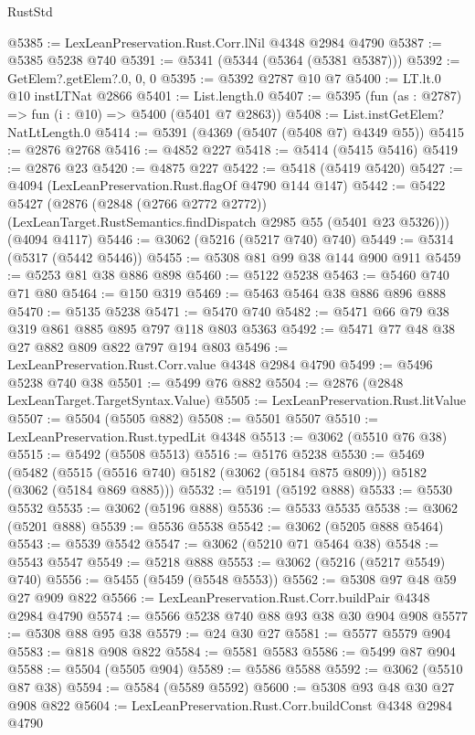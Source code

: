 \begin{lexlean}{RustStd}
\begin{coremodule}
@5385 := LexLeanPreservation.Rust.Corr.lNil @4348 @2984 @4790
@5387 := @5385 @5238 @740
@5391 := @5341 (@5344 (@5364 (@5381 @5387)))
@5392 := GetElem?.getElem?.{0, 0, 0}
@5395 := @5392 @2787 @10 @7
@5400 := LT.lt.{0} @10 instLTNat @2866
@5401 := List.length.{0}
@5407 := @5395 (fun (as : @2787) => fun (i : @10) => @5400 (@5401 @7 @2863))
@5408 := List.instGetElem?NatLtLength.{0}
@5414 := @5391 (@4369 (@5407 (@5408 @7) @4349 @55))
@5415 := @2876 @2768
@5416 := @4852 @227
@5418 := @5414 (@5415 @5416)
@5419 := @2876 @23
@5420 := @4875 @227
@5422 := @5418 (@5419 @5420)
@5427 := @4094 (LexLeanPreservation.Rust.flagOf @4790 @144 @147)
@5442 := @5422
    @5427
    (@2876
      (@2848 (@2766 @2772 @2772))
      (LexLeanTarget.RustSemantics.findDispatch @2985 @55 (@5401 @23 @5326)))
    (@4094 @4117)
@5446 := @3062 (@5216 (@5217 @740) @740)
@5449 := @5314 (@5317 (@5442 @5446))
@5455 := @5308 @81 @99 @38 @144 @900 @911
@5459 := @5253 @81 @38 @886 @898
@5460 := @5122 @5238
@5463 := @5460 @740 @71 @80
@5464 := @150 @319
@5469 := @5463 @5464 @38 @886 @896 @888
@5470 := @5135 @5238
@5471 := @5470 @740
@5482 := @5471 @66 @79 @38 @319 @861 @885 @895 @797 @118 @803 @5363
@5492 := @5471 @77 @48 @38 @27 @882 @809 @822 @797 @194 @803
@5496 := LexLeanPreservation.Rust.Corr.value @4348 @2984 @4790
@5499 := @5496 @5238 @740 @38
@5501 := @5499 @76 @882
@5504 := @2876 (@2848 LexLeanTarget.TargetSyntax.Value)
@5505 := LexLeanPreservation.Rust.litValue
@5507 := @5504 (@5505 @882)
@5508 := @5501 @5507
@5510 := LexLeanPreservation.Rust.typedLit @4348
@5513 := @3062 (@5510 @76 @38)
@5515 := @5492 (@5508 @5513)
@5516 := @5176 @5238
@5530 := @5469
    (@5482 (@5515 (@5516 @740) @5182 (@3062 (@5184 @875 @809))) @5182 (@3062 (@5184 @869 @885)))
@5532 := @5191 (@5192 @888)
@5533 := @5530 @5532
@5535 := @3062 (@5196 @888)
@5536 := @5533 @5535
@5538 := @3062 (@5201 @888)
@5539 := @5536 @5538
@5542 := @3062 (@5205 @888 @5464)
@5543 := @5539 @5542
@5547 := @3062 (@5210 @71 @5464 @38)
@5548 := @5543 @5547
@5549 := @5218 @888
@5553 := @3062 (@5216 (@5217 @5549) @740)
@5556 := @5455 (@5459 (@5548 @5553))
@5562 := @5308 @97 @48 @59 @27 @909 @822
@5566 := LexLeanPreservation.Rust.Corr.buildPair @4348 @2984 @4790
@5574 := @5566 @5238 @740 @88 @93 @38 @30 @904 @908
@5577 := @5308 @88 @95 @38
@5579 := @24 @30 @27
@5581 := @5577 @5579 @904
@5583 := @818 @908 @822
@5584 := @5581 @5583
@5586 := @5499 @87 @904
@5588 := @5504 (@5505 @904)
@5589 := @5586 @5588
@5592 := @3062 (@5510 @87 @38)
@5594 := @5584 (@5589 @5592)
@5600 := @5308 @93 @48 @30 @27 @908 @822
@5604 := LexLeanPreservation.Rust.Corr.buildConst @4348 @2984 @4790

\end{coremodule}
\end{lexlean}
